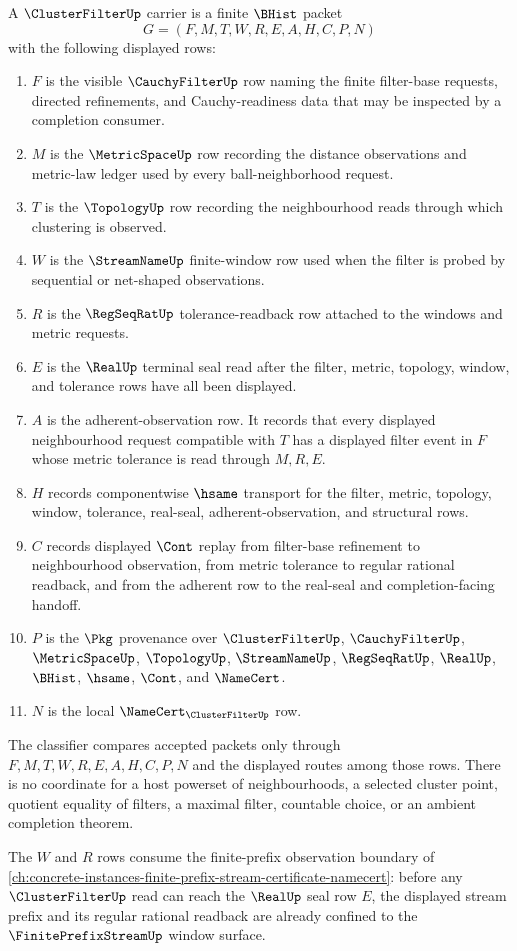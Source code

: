 \begin{definition}
\label{def:cluster-filter-carrier}
A $\ClusterFilterUp$ carrier is a finite $\BHist$ packet
$$
G=(F,M,T,W,R,E,A,H,C,P,N)
$$
with the following displayed rows:
\begin{enumerate}
\item $F$ is the visible $\CauchyFilterUp$ row naming the finite filter-base requests, directed refinements, and Cauchy-readiness data that may be inspected by a completion consumer.
\item $M$ is the $\MetricSpaceUp$ row recording the distance observations and metric-law ledger used by every ball-neighborhood request.
\item $T$ is the $\TopologyUp$ row recording the neighbourhood reads through which clustering is observed.
\item $W$ is the $\StreamNameUp$ finite-window row used when the filter is probed by sequential or net-shaped observations.
\item $R$ is the $\RegSeqRatUp$ tolerance-readback row attached to the windows and metric requests.
\item $E$ is the $\RealUp$ terminal seal read after the filter, metric, topology, window, and tolerance rows have all been displayed.
\item $A$ is the adherent-observation row. It records that every displayed neighbourhood request compatible with $T$ has a displayed filter event in $F$ whose metric tolerance is read through $M,R,E$.
\item $H$ records componentwise $\hsame$ transport for the filter, metric, topology, window, tolerance, real-seal, adherent-observation, and structural rows.
\item $C$ records displayed $\Cont$ replay from filter-base refinement to neighbourhood observation, from metric tolerance to regular rational readback, and from the adherent row to the real-seal and completion-facing handoff.
\item $P$ is the $\Pkg$ provenance over $\ClusterFilterUp$, $\CauchyFilterUp$, $\MetricSpaceUp$, $\TopologyUp$, $\StreamNameUp$, $\RegSeqRatUp$, $\RealUp$, $\BHist$, $\hsame$, $\Cont$, and $\NameCert$.
\item $N$ is the local $\NameCert_{\ClusterFilterUp}$ row.
\end{enumerate}
The classifier compares accepted packets only through $F,M,T,W,R,E,A,H,C,P,N$ and the displayed routes among those rows. There is no coordinate for a host powerset of neighbourhoods, a selected cluster point, quotient equality of filters, a maximal filter, countable choice, or an ambient completion theorem.
\end{definition}
The $W$ and $R$ rows consume the finite-prefix observation boundary of \autoref{ch:concrete-instances-finite-prefix-stream-certificate-namecert}: before any $\ClusterFilterUp$ read can reach the $\RealUp$ seal row $E$, the displayed stream prefix and its regular rational readback are already confined to the $\FinitePrefixStreamUp$ window surface.

